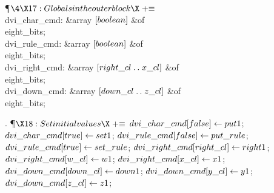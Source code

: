 \Y\P$\4\X17:Globals in the outer block\X\mathrel{+}\S$\6
\4\\{dvi\_char\_cmd}: \&{array} $[\\{boolean}]$ \1\&{of}\5
\\{eight\_bits};\2\6
\4\\{dvi\_rule\_cmd}: \&{array} $[\\{boolean}]$ \1\&{of}\5
\\{eight\_bits};\2\6
\4\\{dvi\_right\_cmd}: \&{array} $[\\{right\_cl}\to\\{x\_cl}]$ \1\&{of}\5
\\{eight\_bits};\2\6
\4\\{dvi\_down\_cmd}: \&{array} $[\\{down\_cl}\to\\{z\_cl}]$ \1\&{of}\5
\\{eight\_bits};\2\par
\fi

. \P$\X18:Set initial values\X\mathrel{+}\S$\6
$\\{dvi\_char\_cmd}[\\{false}]\K\\{put1}$;\5
$\\{dvi\_char\_cmd}[\\{true}]\K\\{set1}$;\6
$\\{dvi\_rule\_cmd}[\\{false}]\K\\{put\_rule}$;\5
$\\{dvi\_rule\_cmd}[\\{true}]\K\\{set\_rule}$;\6
$\\{dvi\_right\_cmd}[\\{right\_cl}]\K\\{right1}$;\5
$\\{dvi\_right\_cmd}[\\{w\_cl}]\K\\{w1}$;\5
$\\{dvi\_right\_cmd}[\\{x\_cl}]\K\\{x1}$;\6
$\\{dvi\_down\_cmd}[\\{down\_cl}]\K\\{down1}$;\5
$\\{dvi\_down\_cmd}[\\{y\_cl}]\K\\{y1}$;\5
$\\{dvi\_down\_cmd}[\\{z\_cl}]\K\\{z1}$;\par
\fi

